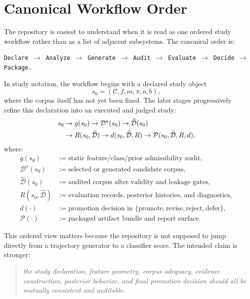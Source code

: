 \documentclass[11pt]{article}
\begin{document}
\section{Canonical Workflow Order}
The repository is easiest to understand when it is read as one ordered study
workflow rather than as a list of adjacent subsystems. The canonical order is:
\begin{center}
\texttt{Declare \(\rightarrow\) Analyze \(\rightarrow\) Generate \(\rightarrow\) Audit \(\rightarrow\) Evaluate \(\rightarrow\) Decide \(\rightarrow\) Package.}
\end{center}

In study notation, the workflow begins with a declared study object
\begin{equation}
s_0 = (\mathcal{C}, f, m, \pi, o, b),
\end{equation}
where the corpus itself has not yet been fixed. The later stages progressively
refine this declaration into an executed and judged study:
\begin{align}
s_0
&\rightarrow
g(s_0)
\rightarrow
\mathcal{D}^{\star}(s_0)
\rightarrow
\widehat{\mathcal{D}}(s_0)
\notag \\
&\rightarrow
R(s_0, \widehat{\mathcal{D}})
\rightarrow
d(s_0, \widehat{\mathcal{D}}, R)
\rightarrow
\mathcal{P}(s_0, \widehat{\mathcal{D}}, R, d),
\end{align}
where:
\begin{align}
g(s_0) &:= \text{static feature/class/prior admissibility audit}, \\
\mathcal{D}^{\star}(s_0) &:= \text{selected or generated candidate corpus}, \\
\widehat{\mathcal{D}}(s_0) &:= \text{audited corpus after validity and leakage gates}, \\
R(s_0, \widehat{\mathcal{D}}) &:= \text{evaluation records, posterior histories, and diagnostics}, \\
d(\cdot) &:= \text{promotion decision in } \{\text{promote}, \text{revise}, \text{reject}, \text{defer}\}, \\
\mathcal{P}(\cdot) &:= \text{packaged artifact bundle and report surface}.
\end{align}

This ordered view matters because the repository is not supposed to jump
directly from a trajectory generator to a classifier score. The intended claim
is stronger:
\begin{quote}
\textit{the study declaration, feature geometry, corpus adequacy, evidence
construction, posterior behavior, and final promotion decision should all be
mutually consistent and auditable.}
\end{quote}
\end{document}
